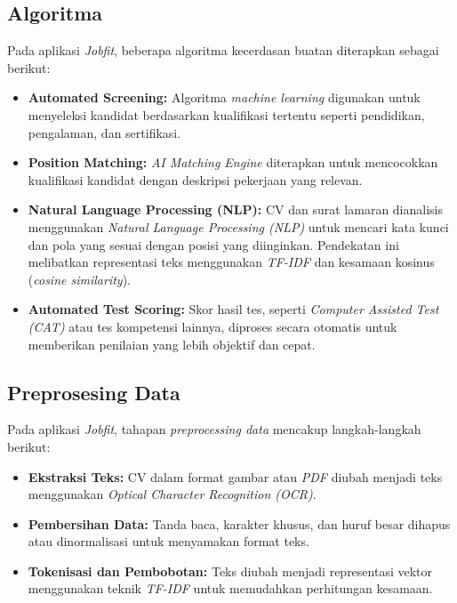 \documentclass[journal,article,submit,pdftex,moreauthors]{Definitions/mdpi}
\begin{document}
\subsection{Algoritma}
Pada aplikasi \textit{Jobfit}, beberapa algoritma kecerdasan buatan diterapkan sebagai berikut:

\begin{itemize}[left=2em]
    \item \textbf{Automated Screening:}
    Algoritma \textit{machine learning} digunakan untuk menyeleksi kandidat berdasarkan kualifikasi tertentu seperti pendidikan, pengalaman, dan sertifikasi.
    \item \textbf{Position Matching:}
    \textit{AI Matching Engine} diterapkan untuk mencocokkan kualifikasi kandidat dengan deskripsi pekerjaan yang relevan.
    \item \textbf{Natural Language Processing (NLP):}
    CV dan surat lamaran dianalisis menggunakan \textit{Natural Language Processing (NLP)} untuk mencari kata kunci dan pola yang sesuai dengan posisi yang diinginkan. Pendekatan ini melibatkan representasi teks menggunakan \textit{TF-IDF} dan kesamaan kosinus (\textit{cosine similarity}).
    \item \textbf{Automated Test Scoring:}
    Skor hasil tes, seperti \textit{Computer Assisted Test (CAT)} atau tes kompetensi lainnya, diproses secara otomatis untuk memberikan penilaian yang lebih objektif dan cepat.
\end{itemize}

\subsection{Preprosesing Data}
Pada aplikasi \textit{Jobfit}, tahapan \textit{preprocessing data} mencakup langkah-langkah berikut:
\begin{itemize}[left=2em]
    \item \textbf{Ekstraksi Teks:}
    CV dalam format gambar atau \textit{PDF} diubah menjadi teks menggunakan \textit{Optical Character Recognition (OCR)}.
    \item \textbf{Pembersihan Data:}
    Tanda baca, karakter khusus, dan huruf besar dihapus atau dinormalisasi untuk menyamakan format teks.
    \item \textbf{Tokenisasi dan Pembobotan:}
    Teks diubah menjadi representasi vektor menggunakan teknik \textit{TF-IDF} untuk memudahkan perhitungan kesamaan.
\end{itemize}
\end{document}

